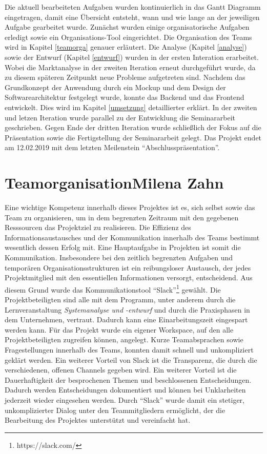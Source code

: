 	Die aktuell bearbeiteten Aufgaben wurden kontinuierlich in das Gantt Diagramm eingetragen, damit eine Übersicht entsteht, wann und wie lange an der jeweiligen Aufgabe gearbeitet wurde. Zunächst wurden einige organisatorische Aufgaben erledigt sowie ein Organisations-Tool eingerichtet. Die Organisation des Teams wird in Kapitel \vref{teamorga} genauer erläutert. Die Analyse (Kapitel \vref{analyse}) sowie der Entwurf (Kapitel \vref{entwurf}) wurden in der ersten Interation erarbeitet. Wobei die Marktanalyse in der zweiten Iteration erneut durchgeführt wurde, da zu diesem späteren Zeitpunkt neue Probleme aufgetreten sind. Nachdem das Grundkonzept der Anwendung durch ein Mockup und dem Design der Softwarearchitektur festgelegt wurde, konnte das Backend und das Frontend entwickelt. Dies wird im Kapitel \vref{umsetzung} detaillierter erklärt. In der zweiten und letzen Iteration wurde parallel zu der Entwicklung die Seminararbeit geschrieben. Gegen Ende der dritten Iteration wurde schließlich der Fokus auf die Präsentation sowie die Fertigstellung der Seminararbeit gelegt. Das Projekt endet am 12.02.2019 mit dem letzten Meilenstein \enquote{Abschlusspräsentation}.
	
	
	\section[Teamorganisation]{Teamorganisation{\hfill \normalsize Milena Zahn}} \label{teamorga}
	Eine wichtige Kompetenz innerhalb dieses Projektes ist es, sich selbst sowie das Team zu organisieren, um in dem begrenzten Zeitraum mit den gegebenen Resssourcen das Projektziel zu realisieren. Die Effizienz des Informationsaustausches und der Kommunikation innerhalb des Teams bestimmt wesentlich dessen Erfolg mit. Eine Hauptaufgabe in Projekten ist somit die Kommunikation\autocite[Vgl.][S. 207]{projektmanagement}. Insbesondere bei den zeitlich begrenzten Aufgaben und temporären Organisationsstrukturen ist ein reibungsloser Austausch, der jedes Projektmitglied mit den essentiellen Informationen versorgt, entscheidend. Aus diesem Grund wurde das Kommunikationstool \enquote{Slack}\footnote{https://slack.com/} gewählt. Die Projektbeteiligten sind alle mit dem Programm, unter anderem durch die Lernveranstaltung \textit{Systemanalyse und -entwurf} und durch die Praxisphasen in dem Unternehmen, vertraut. Dadurch kann eine Einarbeitungszeit eingespart werden kann. Für das Projekt wurde ein eigener Workspace, auf den alle Projektbeteiligten zugreifen können, angelegt. Kurze Teamabsprachen sowie Fragestellungen innerhalb des Teams, konnten damit schnell und unkompliziert geklärt werden. Ein weiterer Vorteil von Slack ist die Transparenz, die durch die verschiedenen, offenen Channels gegeben wird. Ein weiterer Vorteil ist die Dauerhaftigkeit der besprochenen Themen und beschlossenen Entscheidungen. Dadurch werden Entscheidungen dokumentiert und können bei Unklarheiten jederzeit wieder eingesehen werden. Durch \enquote{Slack} wurde damit ein stetiger, unkomplizierter Dialog unter den Teammitgliedern ermöglicht, der die Bearbeitung des Projektes unterstützt und vereinfacht hat.
	
